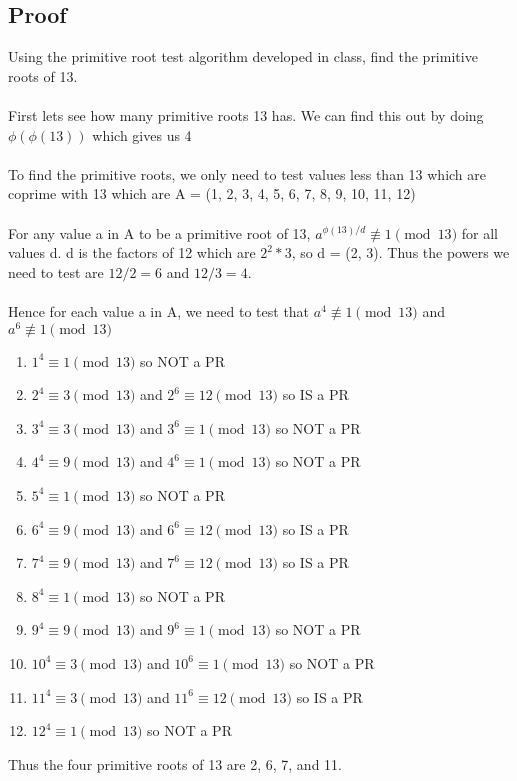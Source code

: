 \documentclass{article}
\begin{document}
\subsection{Proof}
Using the primitive root test algorithm developed in class, find the primitive roots of 13.
\\\\
First lets see how many primitive roots 13 has. We can find this out by doing $\phi(\phi(13))$ which gives us 4
\\\\
To find the primitive roots, we only need to test values less than 13 which are coprime with 13 which are A = (1, 2, 3, 4, 5, 6, 7, 8, 9, 10, 11, 12)
\\\\
For any value a in A to be a primitive root of 13, $a^{\phi(13)/d} \not \equiv 1 \pmod{13}$ for all values d. d is the factors of 12 which are $2^2 * 3$, so d = (2, 3). Thus the powers we need to test are $12/2 = 6$ and $12/3 = 4$.
\\\\
Hence for each value a in A, we need to test that $a^{4} \not \equiv 1 \pmod{13}$ and $a^{6} \not \equiv 1 \pmod{13}$
\begin{enumerate}
    \item $1^4 \equiv 1 \pmod{13}$ so NOT a PR
    \item $2^4 \equiv 3 \pmod{13}$ and $2^6 \equiv 12 \pmod{13}$ so IS a PR
    \item $3^4 \equiv 3 \pmod{13}$ and $3^6 \equiv 1 \pmod{13}$ so NOT a PR
    \item $4^4 \equiv 9 \pmod{13}$ and $4^6 \equiv 1 \pmod{13}$ so NOT a PR
    \item $5^4 \equiv 1 \pmod{13}$ so NOT a PR
    \item $6^4 \equiv 9 \pmod{13}$ and $6^6 \equiv 12 \pmod{13}$ so IS a PR
    \item $7^4 \equiv 9 \pmod{13}$ and $7^6 \equiv 12 \pmod{13}$ so IS a PR
    \item $8^4 \equiv 1 \pmod{13}$ so NOT a PR
    \item $9^4 \equiv 9 \pmod{13}$ and $9^6 \equiv 1 \pmod{13}$ so NOT a PR
    \item $10^4 \equiv 3 \pmod{13}$ and $10^6 \equiv 1 \pmod{13}$ so NOT a PR
    \item $11^4 \equiv 3 \pmod{13}$ and $11^6 \equiv 12 \pmod{13}$ so IS a PR
    \item $12^4 \equiv 1 \pmod{13}$ so NOT a PR
\end{enumerate}
Thus the four primitive roots of 13 are 2, 6, 7, and 11.
\end{document}
